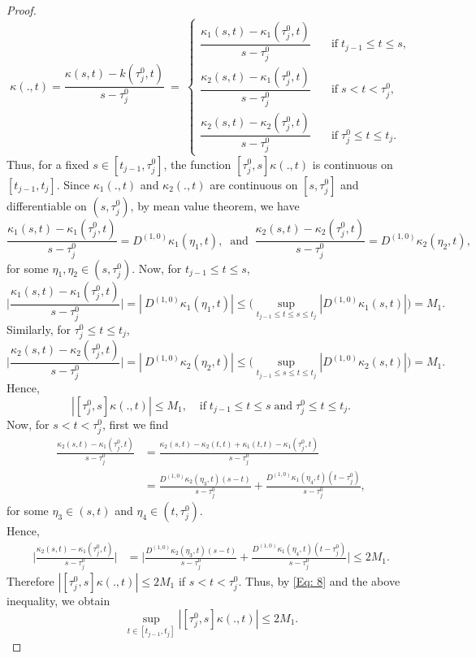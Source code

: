 \documentclass[10pt,a4paper]{amsart}
\begin{document}
\begin{proof}
\begin{equation*}
		[\tau_j^0,s]\kappa(.,t) =\dfrac{\kappa(s,t)-k(\tau_j^0,t)}{s-\tau_j^0} ~=~
		\begin{cases}
			\dfrac{\kappa_1(s,t)-\kappa_1(\tau_j^0,t)}{s-\tau_j^0}  \quad &\text{if}\; t_{j-1} \le t \le s,\\
			\dfrac{\kappa_2(s,t)-\kappa_1(\tau_j^0,t)}{s-\tau_j^0}  \quad &\text{if}\; s < t < \tau_j^0,\\
			\dfrac{\kappa_2(s,t)-\kappa_2(\tau_j^0,t)}{s-\tau_j^0}  \quad &\text{if}\; \tau_j^0 \le t \le t_j.
		\end{cases}
	\end{equation*}	
	Thus, for a fixed $s \in [t_{j-1},\tau_j^0]$, the function $[\tau_j^0,s]\kappa(.,t)$ is continuous on $[t_{j-1},t_j].$
	Since $\kappa_1(.,t)$ and $\kappa_2(.,t)$ are continuous on $[s, \tau_j^0]$ and differentiable on $(s, \tau_j^0)$, by mean value theorem, we have
	$$
	\frac{\kappa_1(s,t)-\kappa_1(\tau_j^0,t)}{s-\tau_j^0} = D^{(1,0)}\kappa_1(\eta_1,t), \;\; \text{and} \;\; \frac{\kappa_2(s,t)-\kappa_2(\tau_j^0,t)}{s-\tau_j^0} = D^{(1,0)}\kappa_2(\eta_2,t),
	$$
	for some $\eta_1, \eta_2 \in (s, \tau_j^0).$
	Now, for $t_{j-1} \le t \le s$,
	$$
	\bigg | \frac{\kappa_1(s,t)-\kappa_1(\tau_j^0,t)}{s-\tau_j^0} \bigg| = \left| \ D^{(1,0)}\kappa_1(\eta_1,t)\right | \le \bigg (\sup_{t_{j-1} \le t \le s \le t_j} \left| D^{(1,0)} \kappa_1(s,t)\right| \bigg ) = M_1. 
	$$
	Similarly, for $\tau_j^0 \le t \le t_j$,
	$$
	\bigg | \frac{\kappa_2(s,t)-\kappa_2(\tau_j^0,t)}{s-\tau_j^0} \bigg| = \left| \ D^{(1,0)}\kappa_2(\eta_2,t)\right | \le \bigg (\sup_{t_{j-1} \le s \le t \le t_j} \left| D^{(1,0)} \kappa_2(s,t)\right| \bigg ) = M_1. 
	$$
	Hence, 
	\begin{equation}\label{Eq: 8}
		\left|[\tau_j^0,s]\kappa(.,t)\right| \le M_1, ~ \; \;\; \text{if} \; t_{j-1} \le t \le s \; \text{and} \; \tau_j^0 \le t \le t_j.
	\end{equation}
	Now, for $s < t < \tau_j^0$, first we find
	\begin{align*}
		\frac{\kappa_2(s,t)-\kappa_1(\tau_j^0,t)}{s-\tau_j^0} &= \frac{\kappa_2(s,t)-\kappa_2(t,t)+\kappa_1(t,t)-\kappa_1(\tau_j^0,t)}{s-\tau_j^0} \\
		&= \frac{D^{(1,0)}\kappa_2(\eta_3,t)(s-t)}{s-\tau_j^0}+\frac{D^{(1,0)}\kappa_1(\eta_4,t)(t-\tau_j^0)}{s-\tau_j^0},
	\end{align*}
	for some $\eta_3 \in (s,t)$ and $\eta_4 \in (t, \tau_j^0).$\\
	Hence, 
	\begin{align*}
		\bigg | \frac{\kappa_2(s,t)-\kappa_1(\tau_j^0,t)}{s-\tau_j^0} \bigg| &= \bigg| \frac{D^{(1,0)}\kappa_2(\eta_3,t)(s-t)}{s-\tau_j^0}+\frac{D^{(1,0)}\kappa_1(\eta_4,t)(t-\tau_j^0)}{s-\tau_j^0}\bigg| \nonumber \leq 2M_1.
	\end{align*}
	Therefore $\displaystyle{\left|[\tau_j^0,s]\kappa(.,t)\right| \le 2M_1}$ if $ s < t < \tau_j^0 $.
	Thus, by \eqref{Eq: 8} and the above inequality, we obtain
	\begin{equation}\label{Eq: 9}
		\sup_{t \in [t_{j-1},t_j]}\left|[\tau_j^0,s]\kappa(.,t)\right| \le 2M_1.
	\end{equation}
	

\end{proof}
\end{document}
